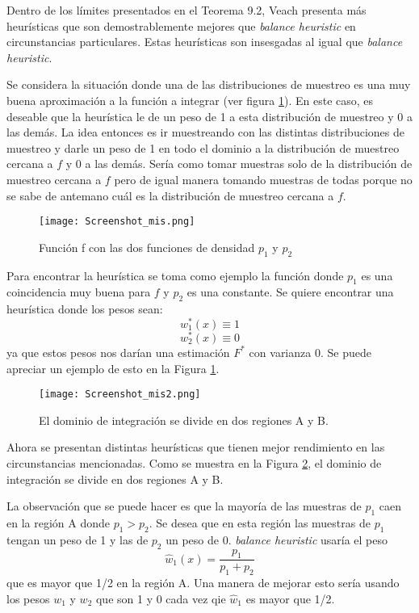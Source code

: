\documentclass{article}
\begin{document}
Dentro de los límites presentados en el Teorema 9.2, Veach presenta más heurísticas que son demostrablemente mejores que \textit{balance heuristic} en circunstancias particulares.
Estas heurísticas son insesgadas al igual que \textit{balance heuristic}.

Se considera la situación donde una de las distribuciones de muestreo es una muy buena aproximación a la función a integrar (ver figura \ref{fig:misother}).
En este caso, es deseable que la heurística le de un peso de 1 a esta distribución de muestreo y 0 a las demás.
La idea entonces es ir muestreando con las distintas distribuciones de muestreo y darle un peso de 1 en todo el dominio a la distribución de muestreo cercana a $f$ y 0 a las demás.
Sería como tomar muestras solo de la distribución de muestreo cercana a $f$ pero de igual manera tomando muestras de todas porque no se sabe de antemano cuál es la distribución de muestreo cercana a $f$.

\begin{figure}[H]
\centering
\texttt{[image: Screenshot\_mis.png]}
\caption{Función f con las dos funciones de densidad $p_{1}$ y $p_{2}$}
\label{fig:misother}
\end{figure}

Para encontrar la heurística se toma como ejemplo la función donde $p_{1}$ es una coincidencia muy buena para $f$ y $p_{2}$ es una constante.
Se quiere encontrar una heurística donde los pesos sean:
$$w^{*}_{1}(x) \equiv 1$$
$$w^{*}_{2}(x) \equiv 0$$
ya que estos pesos nos darían una estimación $F^{*}$ con varianza 0.
Se puede apreciar un ejemplo de esto en la Figura \ref{fig:misother}.

\begin{figure}[H]
\centering
\texttt{[image: Screenshot\_mis2.png]}
\caption{El dominio de integración se divide en dos regiones A y B.}
\label{fig:misother2}
\end{figure}

Ahora se presentan distintas heurísticas que tienen mejor rendimiento en las circunstancias mencionadas.
Como se muestra en la Figura \ref{fig:misother2}, el dominio de integración se divide en dos regiones A y B.

La observación que se puede hacer es que la mayoría de las muestras de $p_{1}$ caen en la región A donde $p_{1} > p_{2}$.
Se desea que en esta región las muestras de $p_{1}$ tengan un peso de 1 y las de $p_{2}$ un peso de 0.
\textit{balance heuristic} usaría el peso
$$ \hat{w}_{1}(x) = \frac{p_1}{p_1 + p_2} $$
que es mayor que 1/2 en la región A. Una manera de mejorar esto sería usando los pesos $w_{1}$ y $w_{2}$ que son 1 y 0 cada vez qie $\hat{w}_{1}$ es mayor que 1/2.
\end{document}
